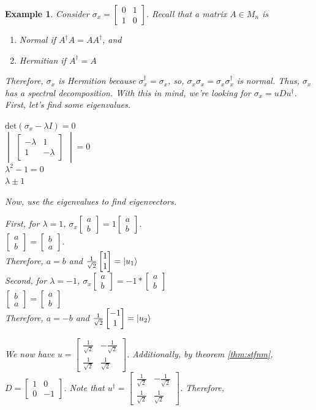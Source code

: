 \documentclass[12pt]{article}
\theoremstyle{plain}
\theoremstyle{nonumberplain}
\theoremstyle{plain}
\newtheorem{example}[lemma]{Example}
\theoremstyle{nonumberplain}
\newcommand\1{{\bf 1}}
\newcommand{\bmat}[1]{\begin{bmatrix*} #1 \end{bmatrix*}} %
\newcommand{\<}{\left\langle}
\renewcommand{\>}{\right\rangle}
\begin{document}
\begin{example}\label{ex:spcdcmp}
Consider $\sigma_x=\bmat{0 & 1 \\ 1 & 0}$. Recall that a matrix $A\in M_n$ is
\begin{enumerate}
\item Normal if $A^\dagger A=AA^\dagger$, and
\item Hermitian if $A^\dagger=A$
\end{enumerate} Therefore, $\sigma_x$ is Hermition because $\sigma_x^\dagger=\sigma_x$, so, $\sigma_x\sigma_x=\sigma_x\sigma_x^\dagger$ is normal. Thus, $\sigma_x$ has a spectral decomposition. With this in mind, we're looking for $\sigma_x=uDu^\dagger$. First, let's find some eigenvalues.
\begin{center}
$\text{det}\left(\sigma_x-\lambda I\right)=0$ \\
$\begin{vmatrix}
\bmat{-\lambda & 1 \\ 1 & -\lambda}
\end{vmatrix}=0
$ \\
$\lambda^2-1=0$ \\
$\lambda\pm 1$
\end{center}
Now, use the eigenvalues to find eigenvectors.
\begin{center}
First, for $\lambda=1$, $\sigma_x\bmat{a \\ b}=1\bmat{a \\ b}$. \\
$\bmat{a \\ b}=\bmat{b \\ a}$. \\ Therefore, $a=b$ and $\frac{1}{\sqrt{2}}\bmat{1 \\ 1}=\ket{u_1}$ \\
Second, for $\lambda=-1$, $\sigma_x\bmat{a \\ b}=-1*\bmat{a \\ b}$ \\ $\bmat{b \\ a}=\bmat{a \\ b}$ \\ Therefore, $a=-b$ and $\frac{1}{\sqrt{2}}\bmat{-1 \\ 1}=\ket{u_2}$
\end{center}
We now have $u=\bmat{\frac{1}{\sqrt{2}} & -\frac{1}{\sqrt{2}} \\ \frac{1}{\sqrt{2}} & \frac{1}{\sqrt{2}}}$. Additionally, by theorem \ref{thm:stfnm}, $D=\bmat{1 & 0 \\ 0 & -1}$. Note that $u^\dagger=\bmat{\frac{1}{\sqrt{2}} & -\frac{1}{\sqrt{2}} \\ \frac{1}{\sqrt{2}} & \frac{1}{\sqrt{2}}}$. Therefore, 

\end{example}
\end{document}
